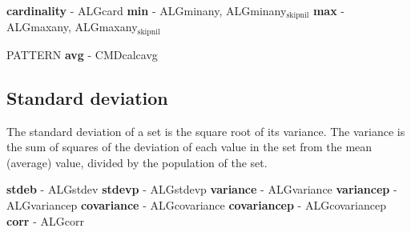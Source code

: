 \documentclass[11pt]{article}
\begin{document}
\textbf{cardinality} - ALGcard
\textbf{min} - ALGminany, ALGminany\(_{\text{skipnil}}\)
\textbf{max} - ALGmaxany, ALGmaxany\(_{\text{skipnil}}\)

PATTERN
\textbf{avg} - CMDcalcavg

\subsection{Standard deviation}
\label{sec:org3d04294}
The standard deviation of a set is the square root of its variance.
The variance is the sum of squares of the deviation of each value in the set from the mean (average) value, divided by the population of the set.

\textbf{stdeb} - ALGstdev
\textbf{stdevp} - ALGstdevp
\textbf{variance} - ALGvariance
\textbf{variancep} - ALGvariancep
\textbf{covariance} - ALGcovariance
\textbf{covariancep} - ALGcovariancep
\textbf{corr} - ALGcorr
\end{document}
